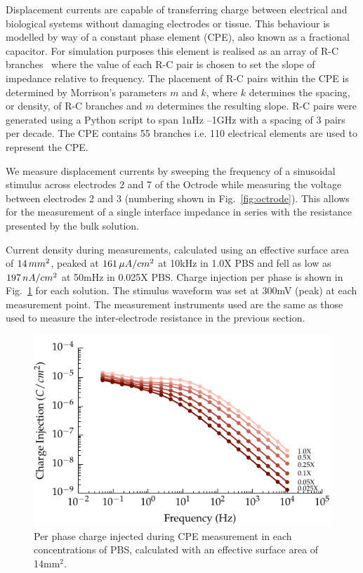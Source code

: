 \documentclass[journal, a4paper]{IEEEtran}
\begin{document}
Displacement currents are capable of transferring charge between electrical and biological systems without damaging electrodes or tissue.\cite{Horch2004}
This behaviour is modelled by way of a constant phase element (CPE), also known as a fractional capacitor.
For simulation purposes this element is realised as an array of R-C branches~\cite{ScottSingle2013,Morrison59,Elwakil10} where the value of each R-C pair is chosen to set the slope of impedance relative to frequency. The placement of R-C pairs within the CPE is determined by Morrison's parameters $m$ and $k$, where $k$ determines the spacing, or density, of R-C branches and $m$ determines the resulting slope. {\color{blue} R-C pairs were generated using a Python script to span 1\thinspace nHz --1\thinspace GHz with a spacing of 3 pairs per decade. The CPE contains 55 branches i.e. 110 {\color{blue}electrical} elements are used to represent the CPE.}


We measure displacement currents by sweeping the frequency of a sinusoidal stimulus across electrodes 2 and 7 of the Octrode while measuring the voltage between electrodes 2 and 3 (numbering shown in Fig.~\ref{fig:octrode}).
This allows for the measurement of a single interface impedance in series with the resistance presented by the bulk solution.


{
    \color{blue}
    Current density during measurements, calculated using an effective surface area of $14\thinspace mm^{2}$, peaked at $161\thinspace \mu A/cm^{2}$ at 10\thinspace kHz in 1.0X PBS and fell as low as $197\thinspace nA/cm^{2}$ at 50\thinspace mHz in 0.025X PBS.
}Charge injection per phase is shown in Fig.~\ref{fig:chargeInjectionVsFrequency} for each solution.
The stimulus waveform was set at 300\thinspace mV (peak) at each measurement point. The measurement instruments used are the same as those used to measure the inter-electrode resistance in the previous section.

\begin{figure}
    \begin{center}
        \includegraphics{graphics/chargeInjectionEffectiveVsFrequency_magnitude}
    \end{center}
    \caption{\color{blue} Per phase charge injected during CPE measurement in each concentrations of PBS{\color{blue}, calculated with an effective surface area of 14\thinspace mm$^{2}$.}}
    \label{fig:chargeInjectionVsFrequency}
\end{figure}
\end{document}
